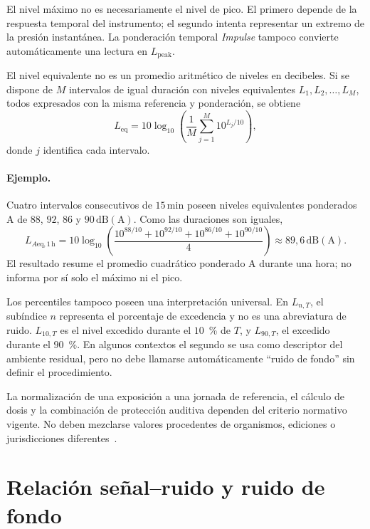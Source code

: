 El nivel máximo no es necesariamente el nivel de pico. El primero depende de
la respuesta temporal del instrumento; el segundo intenta representar un
extremo de la presión instantánea. La ponderación temporal \emph{Impulse}
tampoco convierte automáticamente una lectura en \(L_{\mathrm{peak}}\).

El nivel equivalente no es un promedio aritmético de niveles en decibeles. Si
se dispone de \(M\) intervalos de igual duración con niveles equivalentes
\(L_1,L_2,\ldots,L_M\), todos expresados con la misma referencia y
ponderación, se obtiene
\begin{equation}
    L_{\mathrm{eq}}=
    10\log_{10}\left(
    \frac{1}{M}\sum_{j=1}^{M}10^{L_j/10}
    \right),
    \label{eq:u10-leq-intervalos}
\end{equation}
donde \(j\) identifica cada intervalo.

\paragraph{Ejemplo.}
Cuatro intervalos consecutivos de \(15\,\mathrm{min}\) poseen niveles
equivalentes ponderados A de \(88\), \(92\), \(86\) y \(90\,\mathrm{dB(A)}\).
Como las duraciones son iguales,
\[
L_{A\mathrm{eq},1\,\mathrm{h}}=
10\log_{10}\left(
\frac{10^{88/10}+10^{92/10}+10^{86/10}+10^{90/10}}{4}
\right)
\approx89{,}6\,\mathrm{dB(A)}.
\]
El resultado resume el promedio cuadrático ponderado A durante una hora; no
informa por sí solo el máximo ni el pico.

Los percentiles tampoco poseen una interpretación universal. En
\(L_{n,T}\), el subíndice \(n\) representa el porcentaje de excedencia y no es
una abreviatura de ruido. \(L_{10,T}\) es el nivel excedido durante el
\(10\)~\% de \(T\), y
\(L_{90,T}\), el excedido durante el \(90\)~\%. En algunos contextos el
segundo se usa como descriptor del ambiente residual, pero no debe llamarse
automáticamente ``ruido de fondo'' sin definir el procedimiento.

La normalización de una exposición a una jornada de referencia, el
cálculo de dosis y la combinación de protección auditiva dependen del criterio
normativo vigente. No deben mezclarse valores procedentes de organismos,
ediciones o jurisdicciones diferentes~\cite{nioshNoise1998,argentinaDecreto351}.

\section{Relación señal--ruido y ruido de fondo}
\label{sec:u10-snr-fondo}


